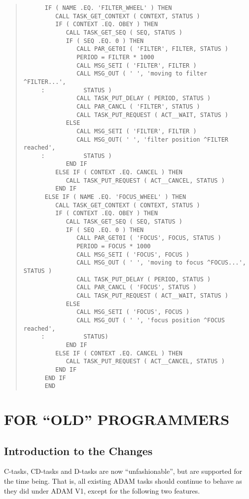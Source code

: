 \begin{quote}
\begin{verbatim}
      IF ( NAME .EQ. 'FILTER_WHEEL' ) THEN
         CALL TASK_GET_CONTEXT ( CONTEXT, STATUS )
         IF ( CONTEXT .EQ. OBEY ) THEN
            CALL TASK_GET_SEQ ( SEQ, STATUS )
            IF ( SEQ .EQ. 0 ) THEN
               CALL PAR_GET0I ( 'FILTER', FILTER, STATUS )
               PERIOD = FILTER * 1000
               CALL MSG_SETI ( 'FILTER', FILTER )
               CALL MSG_OUT ( ' ', 'moving to filter ^FILTER...', 
     :           STATUS )
               CALL TASK_PUT_DELAY ( PERIOD, STATUS )
               CALL PAR_CANCL ( 'FILTER', STATUS )
               CALL TASK_PUT_REQUEST ( ACT__WAIT, STATUS )
            ELSE
               CALL MSG_SETI ( 'FILTER', FILTER )
               CALL MSG_OUT( ' ', 'filter position ^FILTER reached',
     :           STATUS )
            END IF
         ELSE IF ( CONTEXT .EQ. CANCEL ) THEN
            CALL TASK_PUT_REQUEST ( ACT__CANCEL, STATUS )
         END IF
      ELSE IF ( NAME .EQ. 'FOCUS_WHEEL' ) THEN
         CALL TASK_GET_CONTEXT ( CONTEXT, STATUS )
         IF ( CONTEXT .EQ. OBEY ) THEN
            CALL TASK_GET_SEQ ( SEQ, STATUS )
            IF ( SEQ .EQ. 0 ) THEN
               CALL PAR_GET0I ( 'FOCUS', FOCUS, STATUS )
               PERIOD = FOCUS * 1000
               CALL MSG_SETI ( 'FOCUS', FOCUS )
               CALL MSG_OUT ( ' ', 'moving to focus ^FOCUS...', STATUS )
               CALL TASK_PUT_DELAY ( PERIOD, STATUS )
               CALL PAR_CANCL ( 'FOCUS', STATUS )
               CALL TASK_PUT_REQUEST ( ACT__WAIT, STATUS )
            ELSE
               CALL MSG_SETI ( 'FOCUS', FOCUS )
               CALL MSG_OUT ( ' ', 'focus position ^FOCUS reached',
     :           STATUS)
            END IF
         ELSE IF ( CONTEXT .EQ. CANCEL ) THEN
            CALL TASK_PUT_REQUEST ( ACT__CANCEL, STATUS )
         END IF
      END IF
      END
\end{verbatim} \end{quote} \normalsize

\newpage
\section{FOR ``OLD'' PROGRAMMERS}
\label{old}
\subsection{Introduction to the Changes}
C-tasks, CD-tasks and D-tasks are now ``unfashionable'', but are supported
for the time being. That is, all existing ADAM tasks should continue to 
behave as they did under ADAM V1, except for the following two features. 

